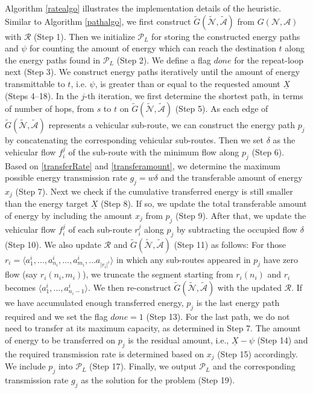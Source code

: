 \documentclass[journal]{IEEEtran}
\begin{document}
Algorithm \ref{ratealgo} illustrates the implementation details of the heuristic. Similar to Algorithm \ref{pathalgo}, we first construct 
$\tilde{G}(\tilde{\mathcal{N}},\tilde{\mathcal{A}})$ from $G(\mathcal{N},\mathcal{A})$ with $\mathcal{R}$ (Step 1). Then we initialize $\mathcal{P}_{L}$ for storing the constructed energy paths and $\psi$ for counting the amount of energy which can reach the destination $t$ along the energy paths found in $\mathcal{P}_{L}$ (Step 2). We define a flag $done$ for the repeat-loop next (Step 3). We construct energy paths iteratively until the amount of energy transmittable to $t$, i.e. $\psi$, is greater than or equal to the requested amount $\underline{X}$ (Steps 4--18). In the $j$-th iteration, we first determine the shortest path, in terms of number of hops, from $s$ to $t$ on $\tilde{G}(\tilde{\mathcal{N}},\tilde{\mathcal{A}})$ (Step 5). As each edge of $\tilde{G}(\tilde{\mathcal{N}},\tilde{\mathcal{A}})$ represents a vehicular sub-route, we can construct the energy path $p_j$ by concatenating the corresponding vehicular sub-routes.  Then we set $\delta$ as the vehicular flow $f_i^j$ of the sub-route with the minimum flow along $p_j$ (Step 6). Based on \eqref{transferRate} and \eqref{transferamount}, we determine the maximum possible energy transmission rate $g_j = w\delta$ and the transferable amount of energy $x_j$ (Step 7). 
Next we check if the cumulative transferred energy is still smaller than the energy target $\underline{X}$ (Step 8). If so, we update the total transferable amount of energy by including the amount $x_j$ from $p_j$ (Step 9). After that, we update the vehicular flow $f_i^j$ of each sub-route $r_i^j$ along $p_j$ by subtracting the occupied flow $\delta$ (Step 10). We also update $\mathcal{R}$ and $\tilde{G}(\tilde{\mathcal{N}},\tilde{\mathcal{A}})$ (Step 11) as follows: For those $r_i=\langle a_1^i, \ldots, a_{n_i}^i,\ldots,a_{m_i}^i,\ldots a_{|r_i|^i}\rangle$ in which any sub-routes appeared in $p_j$ have zero flow (say $r_i(n_i,m_i)$), we truncate the segment starting from $r_i(n_i)$ and $r_i$ becomes $\langle a_1^i, \ldots, a_{n_i-1}^i\rangle$. We then re-construct $\tilde{G}(\tilde{\mathcal{N}},\tilde{\mathcal{A}})$ with the updated $\mathcal{R}$. 
If we have accumulated enough transferred energy, $p_j$ is the last energy path required and we set the flag $done=1$ (Step 13). For the last path, we do not need to transfer at its maximum capacity, as determined in Step 7. The amount of energy  to be transferred on $p_j$ is the residual amount, i.e., $\underline{X}-\psi$ (Step 14) and the required transmission rate is determined based on $x_j$ (Step 15) accordingly.
We include $p_j$ into $\mathcal{P}_L$ (Step 17). Finally, we output $\mathcal{P}_{L}$ and the corresponding transmission rate $g_j$ as the solution for the problem (Step 19).
\end{document}
